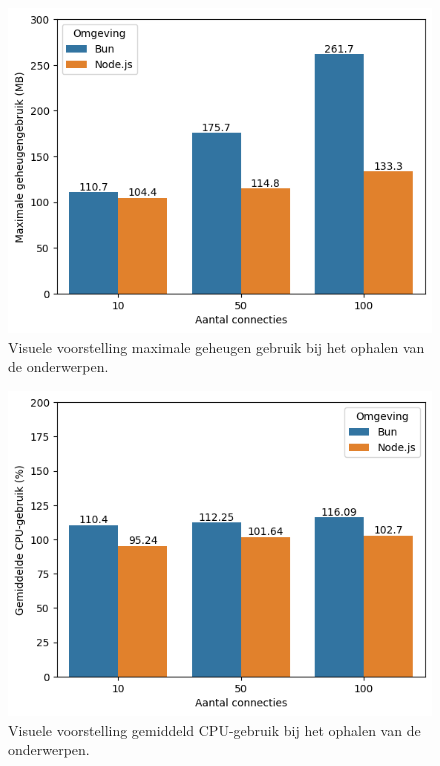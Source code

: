   \begin{figure}[H]
    \centering
    \includegraphics[width=0.7\columnwidth]{graphics/GetMySqlRAM.png}
    \caption{\label{fig:getgeheugenmysql}Visuele voorstelling maximale geheugen gebruik bij het ophalen van de onderwerpen.}
  \end{figure}
  \begin{figure}[H]
    \centering
    \includegraphics[width=0.7\columnwidth]{graphics/GetMySqlCpu.png}
    \caption{\label{fig:getcpumysql}Visuele voorstelling gemiddeld CPU-gebruik bij het ophalen van de onderwerpen.}
  \end{figure}

